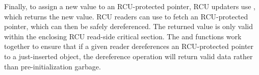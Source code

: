 Finally, to assign a new value to an RCU-protected pointer, RCU updaters use 
, which returns the new value. RCU readers 
can use  to fetch an RCU-protected pointer, 
which can then be safely dereferenced. 
The returned value is only valid within the enclosing RCU read-side critical section.
The  and  functions work
together to ensure that if a given reader dereferences an RCU-protected pointer to 
a just-inserted object, the dereference operation will return valid data rather
than pre-initialization garbage.
